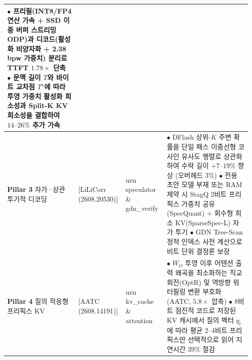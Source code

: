 \documentclass[10pt,a4paper]{article}
\begin{document}
\begin{table}[ht!]
\begin{tabularx}{\textwidth}{p{2.2cm} p{3.5cm} p{2.6cm} X}
$\bullet$ 프리필(INT8/FP4 연산 가속 + SSD 이중 버퍼 스트리밍 ODP)과 디코드(활성화 비양자화 + 2.38 bpw 가중치) 분리로 TTFT $1.78\times$ 단축 \newline
$\bullet$ 문맥 길이 $T$와 바이트 교차점 $T^\star$에 따라 투영 가중치 활성화 희소성과 Split-K KV 희소성을 결합하여 $14\text{--}26\%$ 추가 가속 \\
\midrule
\textbf{Pillar 3} \newline 자가·상관 \newline 투기적 디코딩 &
[LiLiCorr (2608.20530)] \cite{rusanovsky2026lilicorr}  \cite{oda2026trees} \newline
[SpecQuant (2609.21704)] \cite{specquant2026} \newline
[SparseSpec-L (2607.27735)] \cite{liu2026sparsespec}  \cite{ma2026gdntreescan} &
\textsf{uzu} \textsf{speculator} \newline \& \textsf{gdn\_verify} &
$\bullet$ \textsf{DFlash} 상위-$K$ 주변 확률을 단일 패스 이중선형 코사인 유사도 행렬로 상관화하여 수락 길이 $+7\text{--}19\%$ 향상 (오버헤드 $3\%$) \newline
$\bullet$ 전용 초안 모델 부재 또는 RAM 제약 시 \textsf{StagQ} 2비트 프리픽스 가중치 공유(\textsf{SpecQuant}) + 회수형 희소 KV(\textsf{SparseSpec-L}) 자가 투기 \newline
$\bullet$ \textsf{GDN Tree-Scan} 정적 인덱스 사전 계산으로 비트 단위 결정론 보장 \\
\midrule
\textbf{Pillar 4} \newline 질의 적응형 \newline 프리픽스 KV &
[AATC (2608.14191)] \cite{laus2026aatc} \newline
[OptR (2608.02691)] \cite{yun2026optr} \newline
[ReadKV (2610.11245)] \cite{bhandari2026readkv} &
\textsf{uzu} \textsf{kv\_cache} \newline \& \textsf{attention} &
$\bullet$ $W_O$ 투영 이후 어텐션 출력 왜곡을 최소화하는 직교 회전(\textsf{OptR}) 및 역방향 워터필링 변환 부호화(\textsf{AATC}, $5.8\times$ 압축) \newline
$\bullet$ 8비트 점진적 코드로 저장된 KV 캐시에서 질의 벡터 $q_t$에 따라 평균 2--4비트 프리픽스만 선택적으로 읽어 지연시간 $39\%$ 절감 \\
\bottomrule
\end{tabularx}
\label{tab:synthesis_matrix}
\end{table}
\end{document}
